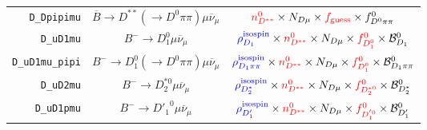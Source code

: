 \begin{landscape}
\begin{table}
\begin{tabular}{r|c|c}
      \texttt{D\_Dpipimu} &  $\overline{B} \rightarrow D^{**} (\rightarrow D^0 \pi\pi) \mu \overline{\nu}_\mu$   &                                                                                                                                    $\textcolor{red}{n^{0}_{D^{**}}} \times N_{D \mu} \times \textcolor{red}{f_\text{guess}} \times f^0_{D^{0}\pi\pi}$                                                                                                                                    \\
        \texttt{D\_uD1mu} &                    $B^- \rightarrow D_1^0 \mu \overline{\nu}_\mu$                    &                                                                                                         $\textcolor{blue}{\rho^\text{isospin}_{D_1}} \times \textcolor{red}{n^{0}_{D^{**}}} \times N_{D \mu} \times \textcolor{red}{f^{0}_{D_1^0}} \times \mathcal{B}^{0}_{D_1}$                                                                                                         \\
  \texttt{D\_uD1mu\_pipi} &       $B^- \rightarrow D_1^0 (\rightarrow D^0 \pi\pi) \mu \overline{\nu}_\mu$        &                                                                                                   $\textcolor{blue}{\rho^\text{isospin}_{D_1\pi\pi}} \times \textcolor{red}{n^{0}_{D^{**}}} \times N_{D \mu} \times \textcolor{red}{f^{0}_{D_1^0}} \times \mathcal{B}^{0}_{D_1\pi\pi}$                                                                                                   \\
        \texttt{D\_uD2mu} &                  $B^- \rightarrow D_2^{*0} \mu \overline{\nu}_\mu$                   &                                                                                                     $\textcolor{blue}{\rho^\text{isospin}_{D_2^*}} \times \textcolor{red}{n^{0}_{D^{**}}} \times N_{D \mu} \times \textcolor{red}{f^{0}_{D_2^{*0}}} \times \mathcal{B}^{0}_{D_2^*}$                                                                                                      \\
       \texttt{D\_uD1pmu} &                  $B^- \rightarrow {D'_1}^0 \mu \overline{\nu}_\mu$                   &                                                                                                      $\textcolor{blue}{\rho^\text{isospin}_{D'_1}} \times \textcolor{red}{n^{0}_{D^{**}}} \times N_{D \mu} \times \textcolor{red}{f^{0}_{D_1^{'0}}} \times \mathcal{B}^{0}_{D'_1}$                                                                                                       \\

\end{tabular}
\end{table}
\end{landscape}
